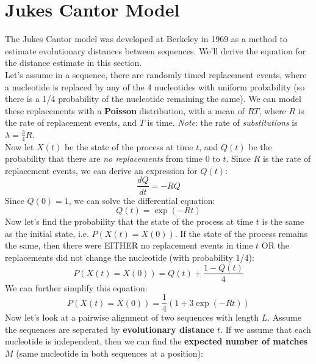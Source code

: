 \documentclass[12pt]{article}
\begin{document}
\section{Jukes Cantor Model}
The Jukes Cantor model was developed at Berkeley in 1969 as a method to estimate evolutionary distances between sequences. We'll derive the equation for the distance estimate in this section.\\[10pt]
Let's assume in a sequence, there are randomly timed replacement events, where a nucleotide is replaced by any of the 4 nucleotides with uniform probability (so there is a 1/4 probability of the nucleotide remaining the same). We can model these replacements with a \textbf{Poisson} distribution, with a mean of $RT$, where $R$ is the rate of replacement events, and $T$ is time. \textit{Note}: the rate of \textit{substitutions} is $\lambda = \frac{3}{4}R$.\\[10pt]
Now let $X(t)$ be the state of the process at time $t$, and $Q(t)$ be the probability that there are \textit{no replacements} from time $0$ to $t$. Since $R$ is the rate of replacement events, we can derive an expression for $Q(t)$:
\begin{equation}
    \frac{dQ}{dt} = -RQ
\end{equation}
Since $Q(0) = 1$, we can solve the differential equation:
\begin{equation}
    Q(t) = \exp(-Rt)
\end{equation}
Now let's find the probability that the state of the process at time $t$ is the same as the initial state, i.e. $P\left(X\left(t\right) = X\left(0\right)\right)$. If the state of the process remains the same, then there were EITHER no replacement events in time $t$ OR the replacements did not change the nucleotide (with probability 1/4):
\begin{equation}
    P\left(X\left(t\right) = X\left(0\right)\right) = Q\left(t\right) + \frac{1-Q\left(t\right)}{4}
\end{equation}
We can further simplify this equation:
\begin{equation}
    P\left(X\left(t\right) = X\left(0\right)\right) = \frac{1}{4}\left(1 + 3\exp\left(-Rt\right)\right)
\end{equation}
Now let's look at a pairwise alignment of two sequences with length $L$. Assume the sequences are seperated by \textbf{evolutionary distance} $t$. If we assume that each nucleotide is independent, then we can find the \textbf{expected number of matches} $M$ (same nucleotide in both sequences at a position):
\end{document}
